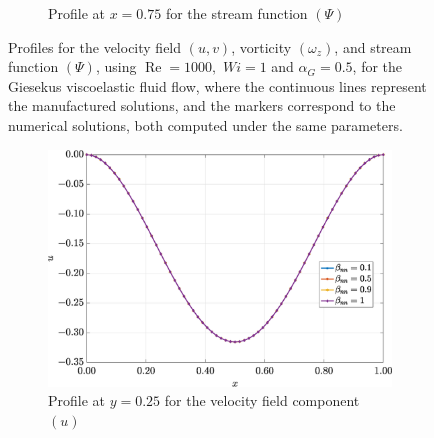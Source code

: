 \documentclass[preprint, 12pt]{elsarticle}
\begin{document}
\begin{figure}[H]
\begin{subfigure}[b]{.46\textwidth}
        \caption{Profile at $x=0.75$ for the stream function $(\Psi)$}
        \label{fig_slice_y_psi_2nd_Case1_giesekus_x075}
    \end{subfigure}
    \vspace{0.02cm}
    \caption{Profiles for the velocity field $(u,v)$, vorticity $(\omega_{z})$, and stream function $(\Psi)$, using $\operatorname{Re}=1000, $ $Wi=1$ and $\alpha_{G} = 0.5$, for the Giesekus viscoelastic fluid flow, where the continuous lines represent the manufactured solutions, and the markers correspond to the numerical solutions, both computed under the same parameters.\label{fig_slice_Solution_uvwzpsi_Giesekus_x075}}
\end{figure}

\begin{figure}[H]
    \centering
    \begin{subfigure}[b]{.46\textwidth}
        \includegraphics[width=\textwidth]{Slice_y_Tog_Numerical_NormErr_2nd_Betann_1_Re_1000_Wi_1_epsilon_0_xi_0_alphaG_0.5_Dt_1e-06_at_0.05_tipsim_1_MMS_12_x0.25y0.25_U.eps}
        \caption{Profile at $y=0.25$ for the velocity field component $(u)$}
        \label{fig_slice_y_u_2nd_Case1_giesekus_y025}
    \end{subfigure}
    \vspace{0.2cm}
    \qquad
    \begin{subfigure}[b]{.46\textwidth}

\end{subfigure}
\end{figure}
\end{document}
